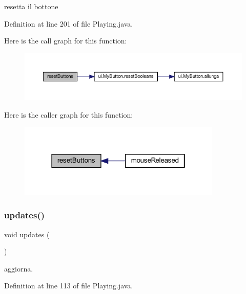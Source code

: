 resetta il bottone 



Definition at line 201 of file Playing.\+java.

Here is the call graph for this function\+:\nopagebreak
\begin{figure}[H]
\begin{center}
\leavevmode
\includegraphics[width=350pt]{classscenes_1_1_playing_a548cf4795e9d559d0c0cce0bb57a5251_cgraph}
\end{center}
\end{figure}
Here is the caller graph for this function\+:\nopagebreak
\begin{figure}[H]
\begin{center}
\leavevmode
\includegraphics[width=274pt]{classscenes_1_1_playing_a548cf4795e9d559d0c0cce0bb57a5251_icgraph}
\end{center}
\end{figure}
\mbox{\label{classscenes_1_1_playing_a79c40c8c02ea1005b787c02252e57172}} 
\subsubsection{\texorpdfstring{updates()}{updates()}}
{\footnotesize\ttfamily void updates (\begin{DoxyParamCaption}{ }\end{DoxyParamCaption})}



aggiorna. 



Definition at line 113 of file Playing.\+java.



